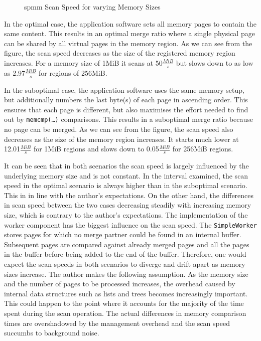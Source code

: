 \begin{figure}
  \centering
  
  \caption{\acs{spmm} Scan Speed for varying Memory Sizes}
  \label{fig:scan-speed}
\end{figure}

In the optimal case, the application software sets all memory pages to contain the same content.
This results in an optimal merge ratio where a single physical page can be shared by all virtual pages in the memory region.
As we can see from the figure, the scan speed decreases as the size of the registered memory region increases.
For a memory size of 1MiB it scans at 50$\frac{MiB}{s}$ but slows down to as low as 2.97$\frac{MiB}{s}$ for regions of 256MiB.

In the suboptimal case, the application software uses the same memory setup, but additionally numbers the last byte(s) of each page in ascending order.
This ensures that each page is different, but also maximises the effort needed to find out by \texttt{memcmp(\ldots)} comparisons.
This results in a suboptimal merge ratio because no page can be merged.
As we can see from the figure, the scan speed also decreases as the size of the memory region increases.
It starts much lower at 12.01$\frac{MiB}{s}$ for 1MiB regions and slows down to 0.05$\frac{MiB}{s}$ for 256MiB regions.

It can be seen that in both scenarios the scan speed is largely influenced by the underlying memory size and is not constant.
In the interval examined, the scan speed in the optimal scenario is always higher than in the suboptimal scenario.
This in in line with the author's expectations.
On the other hand, the differences in scan speed between the two cases decreasing steadily with increasing memory size, which is contrary to the author's expectations.
The implementation of the worker component has the biggest influence on the scan speed.
The \texttt{Simple\-Worker} stores pages for which no merge partner could be found in an internal buffer.
Subsequent pages are compared against already merged pages and all the pages in the buffer before being added to the end of the buffer.
Therefore, one would expect the scan speeds in both scenarios to diverge and drift apart as memory sizes increase.
The author makes the following assumption.
As the memory size and the number of pages to be processed increases, the overhead caused by internal data structures such as lists and trees becomes increasingly important.
This could happen to the point where it accounts for the majority of the time spent during the scan operation.
The actual differences in memory comparison times are overshadowed by the management overhead and the scan speed succumbs to background noise.

